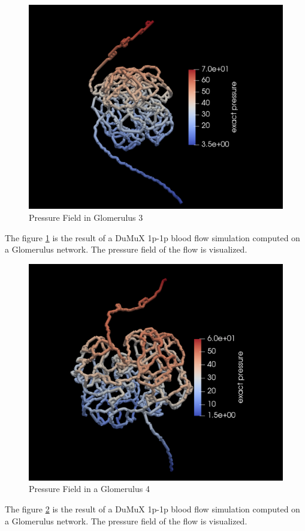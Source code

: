 \begin{figure}[h]
\centering
\includegraphics[width=162mm]{glom3_pressure}
\caption{Pressure Field in Glomerulus 3}
\label{fig:glom3_pressure}
\end{figure}
The figure \ref{fig:glom3_pressure} is the result of a DuMuX 1p-1p blood flow simulation computed on a Glomerulus network. The pressure field of the flow is visualized.\\

\begin{figure}[h]
\centering
\includegraphics[width=162mm]{glom4_pressure}
\caption{Pressure Field in a Glomerulus 4}
\label{fig:glom4_pressure}
\end{figure}
The figure \ref{fig:glom4_pressure} is the result of a DuMuX 1p-1p blood flow simulation computed on a Glomerulus network. The pressure field of the flow is visualized.\\

